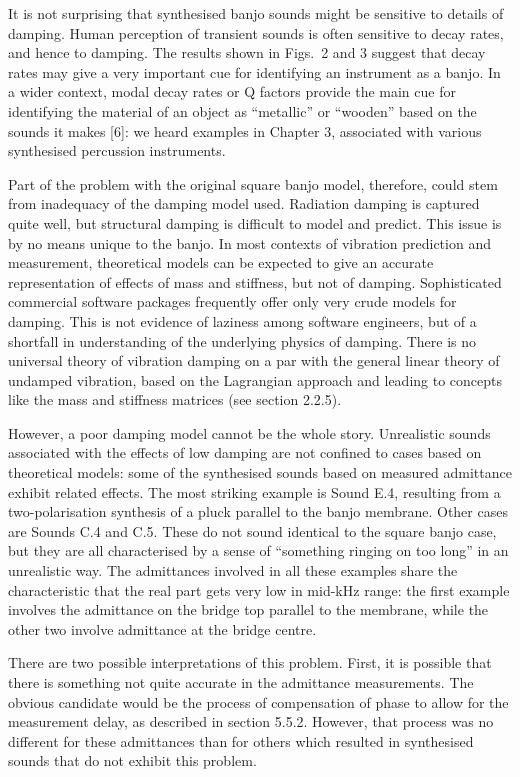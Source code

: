   It is not surprising that synthesised banjo sounds might be sensitive to 
  details of damping. Human perception of transient sounds is often sensitive 
  to decay rates, and hence to damping. The results shown in Figs.\ 2 and 3 
  suggest that decay rates may give a very important cue for identifying an 
  instrument as a banjo. In a wider context, modal decay rates or Q factors 
  provide the main cue for identifying the material of an object as 
  ``metallic'' or ``wooden'' based on the sounds it makes [6]: we heard 
  examples in Chapter 3, associated with various synthesised percussion 
  instruments. 

  Part of the problem with the original square banjo model, therefore, could 
  stem from inadequacy of the damping model used. Radiation damping is captured 
  quite well, but structural damping is difficult to model and predict. This 
  issue is by no means unique to the banjo. In most contexts of vibration 
  prediction and measurement, theoretical models can be expected to give an 
  accurate representation of effects of mass and stiffness, but not of damping. 
  Sophisticated commercial software packages frequently offer only very crude 
  models for damping. This is not evidence of laziness among software 
  engineers, but of a shortfall in understanding of the underlying physics of 
  damping. There is no universal theory of vibration damping on a par with the 
  general linear theory of undamped vibration, based on the Lagrangian approach 
  and leading to concepts like the mass and stiffness matrices (see section 
  2.2.5). 

  However, a poor damping model cannot be the whole story. Unrealistic sounds 
  associated with the effects of low damping are not confined to cases based on 
  theoretical models: some of the synthesised sounds based on measured 
  admittance exhibit related effects. The most striking example is Sound E.4, 
  resulting from a two-polarisation synthesis of a pluck parallel to the banjo 
  membrane. Other cases are Sounds C.4 and C.5. These do not sound identical to 
  the square banjo case, but they are all characterised by a sense of 
  ``something ringing on too long'' in an unrealistic way. The admittances 
  involved in all these examples share the characteristic that the real part 
  gets very low in mid-kHz range: the first example involves the admittance on 
  the bridge top parallel to the membrane, while the other two involve 
  admittance at the bridge centre. 

  There are two possible interpretations of this problem. First, it is possible 
  that there is something not quite accurate in the admittance measurements. 
  The obvious candidate would be the process of compensation of phase to allow 
  for the measurement delay, as described in section 5.5.2. However, that 
  process was no different for these admittances than for others which resulted 
  in synthesised sounds that do not exhibit this problem. 

